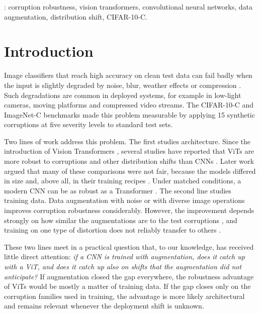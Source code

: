 \documentclass[a4paper,11pt]{article}
\begin{document}
: corruption robustness, vision transformers, convolutional neural networks, data augmentation, distribution shift, CIFAR-10-C.

\section{Introduction}

Image classifiers that reach high accuracy on clean test data can fail badly when the input is slightly degraded by noise, blur, weather effects or compression \cite{hendrycks2019benchmarking,geirhos2018generalisation}. Such degradations are common in deployed systems, for example in low-light cameras, moving platforms and compressed video streams. The CIFAR-10-C and ImageNet-C benchmarks \cite{hendrycks2019benchmarking} made this problem measurable by applying 15 synthetic corruptions at five severity levels to standard test sets.

Two lines of work address this problem. The first studies architecture. Since the introduction of Vision Transformers \cite{dosovitskiy2021image,touvron2021training}, several studies have reported that ViTs are more robust to corruptions and other distribution shifts than CNNs \cite{bhojanapalli2021understanding,paul2022vision,naseer2021intriguing}. Later work argued that many of these comparisons were not fair, because the models differed in size and, above all, in their training recipes \cite{bai2021transformers,pinto2022impartial}. Under matched conditions, a modern CNN can be as robust as a Transformer \cite{pinto2022impartial}. The second line studies training data. Data augmentation with noise \cite{rusak2020simple} or with diverse image operations \cite{hendrycks2020augmix} improves corruption robustness considerably. However, the improvement depends strongly on how similar the augmentations are to the test corruptions \cite{mintun2021interaction,yin2019fourier}, and training on one type of distortion does not reliably transfer to others \cite{geirhos2018generalisation}.

These two lines meet in a practical question that, to our knowledge, has received little direct attention: \emph{if a CNN is trained with augmentation, does it catch up with a ViT, and does it catch up also on shifts that the augmentation did not anticipate?} If augmentation closed the gap everywhere, the robustness advantage of ViTs would be mostly a matter of training data. If the gap closes only on the corruption families used in training, the advantage is more likely architectural and remains relevant whenever the deployment shift is unknown.
\end{document}
